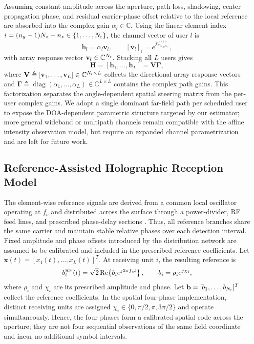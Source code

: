 \documentclass[journal]{IEEEtran}
\begin{document}
Assuming constant amplitude across the aperture, path loss, shadowing, center propagation phase, and residual carrier-phase offset relative to the local reference are absorbed into the complex gain $\alpha_l \in \mathbb{C}$. Using the linear element index $i = (n_y-1)N_z + n_z \in \{1,\ldots,N_{\rm r}\}$, the channel vector of user $l$ is
\begin{equation}
\mathbf{h}_l = \alpha_l \mathbf{v}_l, \qquad [\mathbf{v}_l]_i = e^{j\psi_{n_y,n_z}^{(l)}},
\label{eq:user_channel_vector}
\end{equation}
with array response vector $\mathbf{v}_l \in \mathbb{C}^{N_{\rm r}}$. Stacking all $L$ users gives
\begin{equation}
\mathbf{H} = [\mathbf{h}_1,\ldots,\mathbf{h}_L] = \mathbf{V}\boldsymbol{\Gamma},
\label{eq:H_V_Gamma}
\end{equation}
where $\mathbf{V} \triangleq [\mathbf{v}_1,\ldots,\mathbf{v}_L] \in \mathbb{C}^{N_{\rm r} \times L}$ collects the directional array response vectors and $\boldsymbol{\Gamma} \triangleq \operatorname{diag}(\alpha_1,\ldots,\alpha_L) \in \mathbb{C}^{L \times L}$ contains the complex path gains. This factorization separates the angle-dependent spatial steering matrix from the per-user complex gains. We adopt a single dominant far-field path per scheduled user to expose the DOA-dependent parametric structure targeted by our estimator; more general wideband or multipath channels remain compatible with the affine intensity observation model, but require an expanded channel parametrization and are left for future work.


\subsection{Reference-Assisted Holographic Reception Model}

The element-wise reference signals are derived from a common local oscillator
operating at $f_c$ and distributed across the surface through a power-divider,
RF feed lines, and prescribed phase-delay sections
\cite{huangjd2024CS,yin2025hisprototype}. Thus, all reference branches
share the same carrier and maintain stable relative phases over each detection
interval. Fixed amplitude and phase offsets introduced by the distribution
network are assumed to be calibrated and included in the prescribed reference
coefficients. Let $\mathbf x(t)=[x_1(t),\ldots,x_L(t)]^T$. At receiving unit $i$,
the resulting reference is
\begin{equation}
b_i^{\rm RF}(t)
=
\sqrt{2}\operatorname{Re}\!\left\{b_i e^{j2\pi f_ct}\right\},
\qquad b_i=\rho_i e^{j\chi_i},
\label{eq:rf_reference_wave}
\end{equation}
where $\rho_i$ and $\chi_i$ are its prescribed amplitude and phase. Let
$\mathbf b=[b_1,\ldots,b_{N_{\rm r}}]^T$ collect the reference coefficients.
In the spatial four-phase implementation, distinct receiving units are assigned
$\chi_i\in\{0,\pi/2,\pi,3\pi/2\}$ and operate simultaneously. Hence, the four
phases form a calibrated spatial code across the aperture; they are not four
sequential observations of the same field coordinate and incur no additional
symbol intervals.
\end{document}
